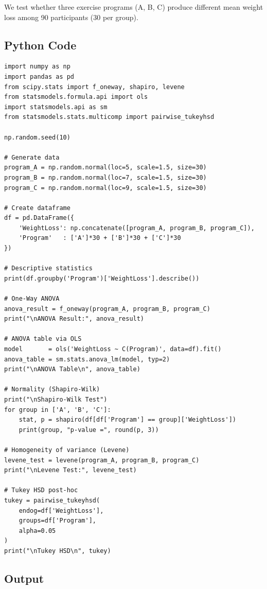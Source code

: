 \documentclass[12pt,a4paper]{article}
\begin{document}
We test whether three exercise programs (A, B, C) produce different mean weight loss among 90 participants (30 per group).

\subsection{Python Code}

\begin{lstlisting}
import numpy as np
import pandas as pd
from scipy.stats import f_oneway, shapiro, levene
from statsmodels.formula.api import ols
import statsmodels.api as sm
from statsmodels.stats.multicomp import pairwise_tukeyhsd

np.random.seed(10)

# Generate data
program_A = np.random.normal(loc=5, scale=1.5, size=30)
program_B = np.random.normal(loc=7, scale=1.5, size=30)
program_C = np.random.normal(loc=9, scale=1.5, size=30)

# Create dataframe
df = pd.DataFrame({
    'WeightLoss': np.concatenate([program_A, program_B, program_C]),
    'Program'   : ['A']*30 + ['B']*30 + ['C']*30
})

# Descriptive statistics
print(df.groupby('Program')['WeightLoss'].describe())

# One-Way ANOVA
anova_result = f_oneway(program_A, program_B, program_C)
print("\nANOVA Result:", anova_result)

# ANOVA table via OLS
model       = ols('WeightLoss ~ C(Program)', data=df).fit()
anova_table = sm.stats.anova_lm(model, typ=2)
print("\nANOVA Table\n", anova_table)

# Normality (Shapiro-Wilk)
print("\nShapiro-Wilk Test")
for group in ['A', 'B', 'C']:
    stat, p = shapiro(df[df['Program'] == group]['WeightLoss'])
    print(group, "p-value =", round(p, 3))

# Homogeneity of variance (Levene)
levene_test = levene(program_A, program_B, program_C)
print("\nLevene Test:", levene_test)

# Tukey HSD post-hoc
tukey = pairwise_tukeyhsd(
    endog=df['WeightLoss'],
    groups=df['Program'],
    alpha=0.05
)
print("\nTukey HSD\n", tukey)
\end{lstlisting}

\subsection{Output}
\end{document}

